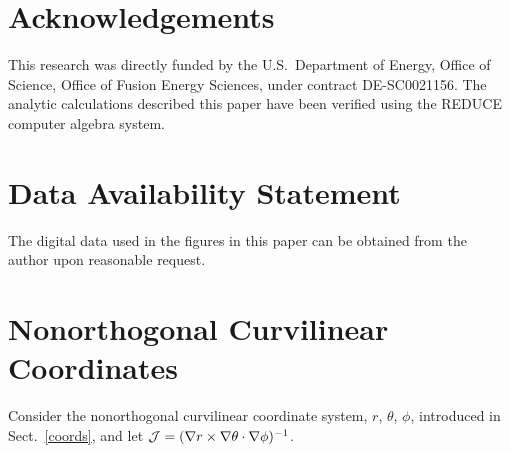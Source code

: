 \documentclass[12pt,prb,aps]{revtex4-1}
\begin{document}
\section*{Acknowledgements}
This research was directly funded by the U.S.\ Department of Energy, Office of Science, Office of Fusion Energy Sciences, under  contract DE-SC0021156. 
The analytic calculations  described  this paper have been verified using the {\sc REDUCE} computer algebra system.

\section*{Data Availability Statement}
The digital data used in the figures in this paper can be obtained from the author upon reasonable request.

\appendix
\section{Nonorthogonal Curvilinear Coordinates}\label{s2}
Consider the nonorthogonal curvilinear coordinate system, $r$, $\theta$, $\phi$,  introduced in Sect.~\ref{coords}, and let
${\cal J}=  (\nabla r\times \nabla\theta\cdot\nabla\phi)^{-1}$.
\end{document}
